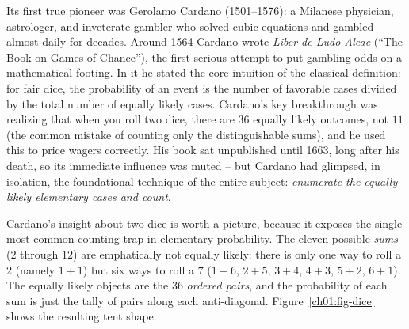 Its first true pioneer was Gerolamo Cardano (1501--1576): a Milanese physician,
astrologer, and inveterate gambler who solved cubic equations and gambled almost
daily for decades. Around 1564 Cardano wrote \emph{Liber de Ludo Aleae} (``The
Book on Games of Chance''), the first serious attempt to put gambling odds on a
mathematical footing. In it he stated the core intuition of the classical
definition: for fair dice, the probability of an event is the number of favorable
cases divided by the total number of equally likely cases. Cardano's key
breakthrough was realizing that when you roll two dice, there are $36$ equally
likely outcomes, not $11$ (the common mistake of counting only the
distinguishable sums), and he used this to price wagers correctly. His book sat
unpublished until 1663, long after his death, so its immediate influence was
muted -- but Cardano had glimpsed, in isolation, the foundational technique of
the entire subject: \emph{enumerate the equally likely elementary cases and
count}.

Cardano's insight about two dice is worth a picture, because it exposes the single
most common counting trap in elementary probability. The eleven possible
\emph{sums} ($2$ through $12$) are emphatically not equally likely: there is
only one way to roll a $2$ (namely $1{+}1$) but six ways to roll a $7$ ($1{+}6$,
$2{+}5$, $3{+}4$, $4{+}3$, $5{+}2$, $6{+}1$). The equally likely objects are the
$36$ \emph{ordered pairs}, and the probability of each sum is just the tally of
pairs along each anti-diagonal. Figure~\ref{ch01:fig-dice} shows the resulting
tent shape.

